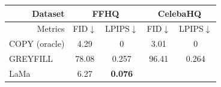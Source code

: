 \begin{table}[t]
\small
\begin{tabular}{|l|c|c|c|c|}
\hline
\multicolumn{1}{|r|}{Dataset} &
  \multicolumn{2}{c|}{FFHQ} &
  \multicolumn{2}{c|}{CelebaHQ} \\ \hline

\multicolumn{1}{|r|}{Metrics} &
  \multicolumn{1}{c|}{FID$\downarrow$} &
  \multicolumn{1}{c|}{LPIPS$\downarrow$} &
  \multicolumn{1}{c|}{FID$\downarrow$} &
  \multicolumn{1}{c|}{LPIPS$\downarrow$} \\
  \hline %
  \rowcolor[gray]{0.7}
COPY (oracle) &
  4.29 & 0
  & 3.01 & 0 \\ \hline
GREYFILL &
  78.08 &
  0.257
  &
  96.41 &
  0.264
   \\ \Xhline{4\arrayrulewidth}
LaMa&
  6.27 &
  \textbf{0.076}
   &

\end{tabular}
\end{table}

